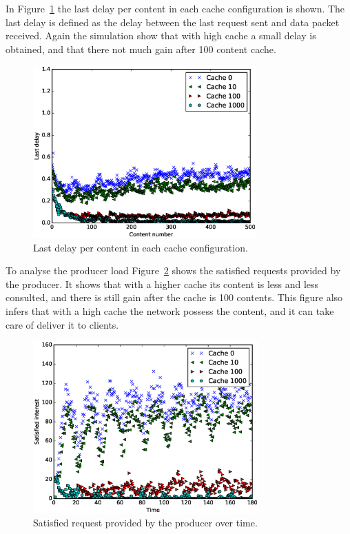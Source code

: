 \documentclass[10pt,a4paper,final]{IEEEtran}
\begin{document}
In Figure~\ref{fig:last} the last delay per content in each cache configuration
is shown. The last delay is defined as the delay between the last request sent
and data packet received. Again the simulation show that with high cache a
small delay is obtained, and that there not much gain after 100 content cache.

\begin{figure}
\centering
\includegraphics[height=2.6in]{last}
\caption{Last delay per content in each cache configuration.}\label{fig:last}
\end{figure}

To analyse the producer load Figure~\ref{fig:prodsatis} shows the satisfied
requests provided by the producer. It shows that with a higher cache its
content is less and less consulted, and there is still gain after the cache is
100 contents. This figure also infers that with a high cache the network
possess the content, and it can take care of deliver it to clients.

\begin{figure}
\centering
\includegraphics[height=2.6in]{prodsatis}
\caption{Satisfied request provided by the producer over
time.}\label{fig:prodsatis}
\end{figure}
\end{document}
